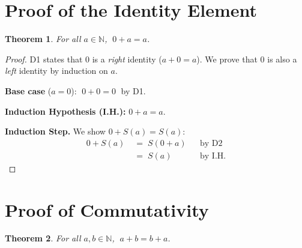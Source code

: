 \documentclass[12pt, a4paper]{article}
\theoremstyle{plain}
\newtheorem{theorem}{Theorem}
\theoremstyle{definition}
\begin{document}
\section*{Proof of the Identity Element}

\begin{theorem}
For all $a \in \mathbb{N}$, $\;0 + a = a$.
\end{theorem}

\begin{proof}
D1 states that $0$ is a \emph{right} identity ($a + 0 = a$).
We prove that $0$ is also a \emph{left} identity by induction on $a$.

\medskip
\noindent\textbf{Base case} ($a = 0$):
$\;0 + 0 = 0\;$ by D1.

\medskip
\noindent\textbf{Induction Hypothesis (I.H.):} $0 + a = a$.

\medskip
\noindent\textbf{Induction Step.} We show $0 + S(a) = S(a)$:
\[
\begin{aligned}
  0 + S(a)
    &\;=\; S(0 + a) &&\text{by D2}\\
    &\;=\; S(a)     &&\text{by I.H.}
\end{aligned}
\]
\qedhere
\end{proof}

\section*{Proof of Commutativity}

\begin{theorem}
For all $a, b \in \mathbb{N}$, $\;a + b = b + a$.
\end{theorem}
\end{document}

